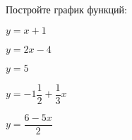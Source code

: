 \begin{ex}
	\begin{condition}
		Постройте график функций:
		\begin{enumcols}[itemcolumns=2]
			\item \( y=x+1 \)
			\item \( y=2x-4 \)
			\item \( y=5 \)
			\item \( y=-1\dfrac{1}{2}+\dfrac{1}{3}x \)
			\item \( y=\dfrac{6-5x}{2} \)
		\end{enumcols}
	\end{condition}
\end{ex}